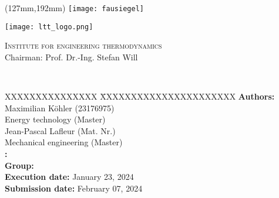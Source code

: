 \begin{titlepage}
	\thispagestyle{empty}

	\begin{textblock*}{\textwidth}(127mm,192mm)
	\texttt{[image: fausiegel]}
	\end{textblock*}

	\begin{minipage}[]{47mm}
		\texttt{[image: ltt\_logo.png]}
	\end{minipage}
	\begin{minipage}[]{.7\textwidth}
		\raggedleft
		\textsc{Institute for engineering thermodynamics}\\ %
		Chairman: Prof. Dr.-Ing. Stefan Will
	\end{minipage}
	
	\vspace{51mm}
	
	{\centering
	
	\large{\arbeit} \\	
	\Large{\textbf{\titel}}
	
	\par}
	
	\vfill
	
	{\raggedright
	\begin{tabbing}
	XXXXXXXXXXXXXXX \= XXXXXXXXXXXXXXXXXXXXXX \kill
		\textbf{Authors:} 			\> Maximilian Köhler (23176975) \\	
									\> Energy technology (Master) \\[12pt]
									\> Jean-Pascal Lafleur (Mat. Nr.) \\
									\> Mechanical engineering (Master) \\[12pt]
		\textbf{\langdbbetreuer:}	\> \betreuer 						\\[6pt]
		\textbf{Group:}												\\[12pt]
		\textbf{Execution date:}	\> January 23, 2024 			\\[12pt]
		\textbf{Submission date:}	\> February 07, 2024															
	\end{tabbing}
	\par}
\end{titlepage}
